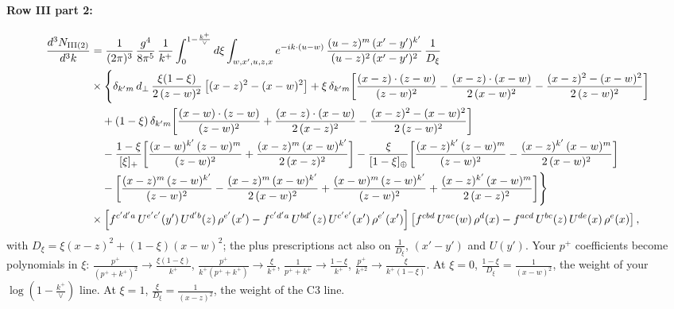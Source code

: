 \documentclass[9pt]{article}
\numberwithin{equation}{section}
\begin{document}
\paragraph{Row III part 2:}
\begin{align}
\frac{d^{3}N_{\rm III(2)}}{d^{3}k} & = \frac{1}{(2\pi)^{3}}\,\frac{g^{4}}{8\pi^{5}}\,\frac{1}{k^{+}}\int_{0}^{1-\frac{k^{+}}{\vee}}d\xi\int_{w,x',u,z,x} e^{-ik\cdot (u-w)}\, \frac{(u-z)^{m}\,(x'-y')^{k'}}{(u-z)^{2}\,(x'-y')^{2}}\,\frac{1}{D_\xi}\notag\\
&\times\Bigg\{\delta_{k'm}\,d_{\perp}\,\frac{\xi(1-\xi)}{2\,(z-w)^{2}}\left[(x-z)^{2}-(x-w)^{2}\right]+\xi\,\delta_{k'm}\bigg[\frac{(x-z)\cdot (z-w)}{(z-w)^{2}} -\frac{(x-z)\cdot (x-w)}{2\,(x-w)^{2}}-\frac{(x-z)^{2}-(x-w)^{2}}{2\,(z-w)^{2}}\bigg]\notag\\
&\quad+(1-\xi)\,\delta_{k'm}\bigg[\frac{(x-w)\cdot (z-w)}{(z-w)^{2}}+\frac{(x-z)\cdot (x-w)}{2\,(x-z)^{2}} -\frac{(x-z)^{2}-(x-w)^{2}}{2\,(z-w)^{2}}\bigg]\notag\\
&\quad-\frac{1-\xi}{[\xi]_+}\bigg[\frac{(x-w)^{k'}\,(z-w)^{m}}{(z-w)^{2}}+\frac{(x-z)^{m}\,(x-w)^{k'}}{2\,(x-z)^{2}}\bigg]-\frac{\xi}{[1-\xi]_\oplus}\bigg[\frac{(x-z)^{k'}\,(z-w)^{m}}{(z-w)^{2}} -\frac{(x-z)^{k'}\,(x-w)^{m}}{2\,(x-w)^{2}}\bigg]\notag\\
&\quad-\bigg[\frac{(x-z)^{m}\,(z-w)^{k'}}{(z-w)^{2}}-\frac{(x-z)^{m}\,(x-w)^{k'}}{2\,(x-w)^{2}}+\frac{(x-w)^{m}\,(z-w)^{k'}}{(z-w)^{2}} +\frac{(x-z)^{k'}\,(x-w)^{m}}{2\,(x-z)^{2}}\bigg]\Bigg\}\notag\\
&\times\left[f^{c'd'a}\,U^{e'c'}(y')\,U^{d'b}(z)\,\rho^{e'}(x')-f^{c'd'a}\, U^{bd'}(z)\,U^{c'e'}(x')\,\rho^{e'}(x')\right]\left[f^{cbd}\,U^{ac}(w)\,\rho^{d}(x) -f^{acd}\,U^{bc}(z)\,U^{de}(x)\,\rho^{e}(x)\right],
\end{align}
with $D_\xi=\xi(x-z)^2+(1-\xi)(x-w)^2$; the plus prescriptions act also on $\frac{1}{D_\xi}$, $(x'-y')$ and $U(y')$. Your $p^+$ coefficients become polynomials in $\xi$: $\frac{p^+}{(p^++k^+)^2}\to\frac{\xi(1-\xi)}{k^+}$, $\frac{p^+}{k^+(p^++k^+)}\to\frac{\xi}{k^+}$, $\frac{1}{p^++k^+}\to\frac{1-\xi}{k^+}$, $\frac{p^+}{k^{+2}}\to\frac{\xi}{k^+(1-\xi)}$. At $\xi=0$, $\frac{1-\xi}{D_\xi}=\frac{1}{(x-w)^2}$, the weight of your $\log(1-\frac{k^+}{\vee})$ line. At $\xi=1$, $\frac{\xi}{D_\xi}=\frac{1}{(x-z)^2}$, the weight of the C3 line.
\end{document}
